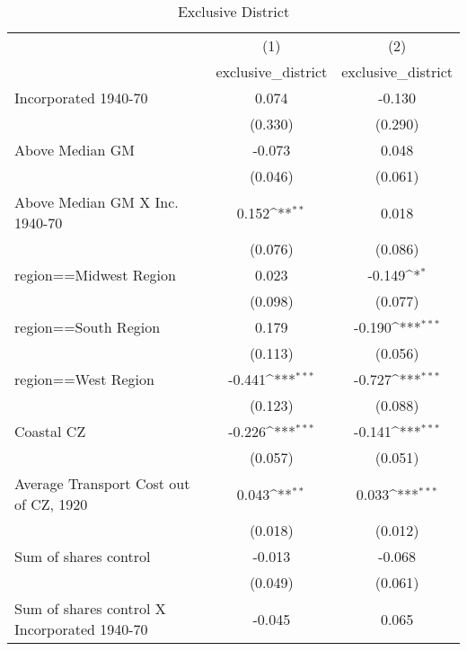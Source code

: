 \begin{table}[htbp]\centering
\def\sym#1{\ifmmode^{#1}\else\(^{#1}\)\fi}
\caption{Exclusive District}
\begin{tabular}{l*{2}{c}}
\hline\hline
                    &\multicolumn{1}{c}{(1)}&\multicolumn{1}{c}{(2)}\\
                    &\multicolumn{1}{c}{exclusive\_district}&\multicolumn{1}{c}{exclusive\_district}\\
\hline
Incorporated 1940-70&       0.074         &      -0.130         \\
                    &     (0.330)         &     (0.290)         \\
[1em]
Above Median GM     &      -0.073         &       0.048         \\
                    &     (0.046)         &     (0.061)         \\
[1em]
Above Median GM X Inc. 1940-70&       0.152\sym{**} &       0.018         \\
                    &     (0.076)         &     (0.086)         \\
[1em]
region==Midwest Region&       0.023         &      -0.149\sym{*}  \\
                    &     (0.098)         &     (0.077)         \\
[1em]
region==South Region&       0.179         &      -0.190\sym{***}\\
                    &     (0.113)         &     (0.056)         \\
[1em]
region==West Region &      -0.441\sym{***}&      -0.727\sym{***}\\
                    &     (0.123)         &     (0.088)         \\
[1em]
Coastal CZ          &      -0.226\sym{***}&      -0.141\sym{***}\\
                    &     (0.057)         &     (0.051)         \\
[1em]
Average Transport Cost out of CZ, 1920&       0.043\sym{**} &       0.033\sym{***}\\
                    &     (0.018)         &     (0.012)         \\
[1em]
Sum of shares control&      -0.013         &      -0.068         \\
                    &     (0.049)         &     (0.061)         \\
[1em]
Sum of shares control X Incorporated 1940-70&      -0.045         &       0.065         \\

\end{tabular}
\end{table}
